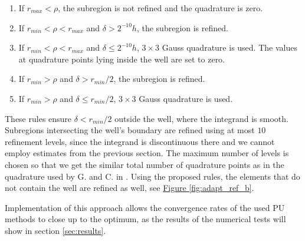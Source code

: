 \documentclass{elsarticle}
\newcommand{\fig}[1]{\hyperref[#1]{Figure \ref{#1}}}
\newcommand{\notePE}[1]{{\color{Orange} \textbf{PE: } \textit{#1}}}
\begin{document}
\begin{enumerate}
 \item If $r_{max} < \rho$, the subregion is not refined and the quadrature is zero.
 \item If $r_{min} < \rho < r_{max}$ and $\delta > 2^{-10}h$, the subregion is refined.
 \item If $r_{min} < \rho < r_{max}$ and $\delta \le 2^{-10}h$, $3\times3$ Gauss quadrature is used.
 The values at quadrature points lying inside the well are set to zero.
 \item If $r_{min} > \rho$ and $\delta > r_{min} / 2$, the subregion is refined.
 \item If $r_{min} > \rho$ and $\delta \le r_{min} / 2$, $3\times3$ Gauss quadrature is used.
\end{enumerate}


These rules ensure $\delta < r_{min}/2$ outside the well, where the integrand is smooth. Subregions intersecting 
the well's boundary are refined using at most $10$ refinement levels, since the integrand is discontinuous there and we cannot employ 
estimates from the previous section. The maximum number of levels is chosen so that we get the similar total number of quadrature points 
as in the quadrature used by G. and C. in \cite{gracie_modelling_2010}. Using the proposed rules, the elements that do not contain the well are refined as well,
see \fig{fig:adapt_ref_b}. 

Implementation of this approach allows the convergence rates of the used PU methods to close up to the optimum,
as the results of the numerical tests will show in section \ref{sec:results}.


% 
% 
\end{document}
